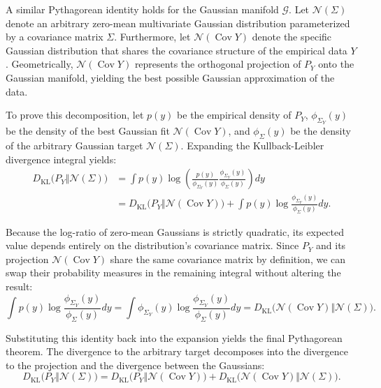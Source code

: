 \documentclass[12pt,a4paper,twoside,openany]{book}
\begin{document}
A similar Pythagorean identity holds for the Gaussian manifold $\mathcal{G}$. 
Let $\mathcal{N}(\Sigma)$ denote an arbitrary zero-mean multivariate Gaussian distribution parameterized by a covariance matrix $\Sigma$. 
Furthermore, let $\mathcal{N}(\operatorname{Cov} Y)$ denote the specific Gaussian distribution that shares the covariance structure 
of the empirical data $Y$. Geometrically, $\mathcal{N}(\operatorname{Cov} Y)$ represents the orthogonal projection of $P_Y$ onto the 
Gaussian manifold, yielding the best possible Gaussian approximation of the data. 

To prove this decomposition, let $p(y)$ be the empirical density of $P_Y$, $\phi_{\Sigma_Y}(y)$ be the density of 
the best Gaussian fit $\mathcal{N}(\operatorname{Cov} Y)$, and $\phi_{\Sigma}(y)$ be the density of the arbitrary Gaussian target $\mathcal{N}(\Sigma)$. 
Expanding the Kullback-Leibler divergence integral yields:
\begin{align}
    D_{\mathrm{KL}}\big(P_Y \Vert \mathcal{N}(\Sigma)\big) &= \int p(y) \log \left( \frac{p(y)}{\phi_{\Sigma_Y}(y)} \frac{\phi_{\Sigma_Y}(y)}{\phi_{\Sigma}(y)} \right) dy \nonumber \\
    &= D_{\mathrm{KL}}\big(P_Y \Vert \mathcal{N}(\operatorname{Cov} Y)\big) + \int p(y) \log \frac{\phi_{\Sigma_Y}(y)}{\phi_{\Sigma}(y)} dy.
\end{align}

Because the log-ratio of zero-mean Gaussians is strictly quadratic, its expected value depends entirely on the distribution's covariance matrix. 
Since $P_Y$ and its projection $\mathcal{N}(\operatorname{Cov} Y)$ share the same covariance matrix by definition, 
we can swap their probability measures in the remaining integral without altering the result:
\begin{equation}
    \int p(y) \log \frac{\phi_{\Sigma_Y}(y)}{\phi_{\Sigma}(y)} dy = \int \phi_{\Sigma_Y}(y) \log \frac{\phi_{\Sigma_Y}(y)}{\phi_{\Sigma}(y)} dy = D_{\mathrm{KL}}\big(\mathcal{N}(\operatorname{Cov} Y) \Vert \mathcal{N}(\Sigma)\big).
\end{equation}

Substituting this identity back into the expansion yields the final Pythagorean theorem. 
The divergence to the arbitrary target decomposes into the divergence to the projection and the divergence between the Gaussians:
\begin{equation}\label{eq:pythagoras_gaussian}
    D_{\mathrm{KL}}\big(P_Y \Vert \mathcal{N}(\Sigma)\big) = D_{\mathrm{KL}}\big(P_Y \Vert \mathcal{N}(\operatorname{Cov} Y)\big) + D_{\mathrm{KL}}\big(\mathcal{N}(\operatorname{Cov} Y) \Vert \mathcal{N}(\Sigma)\big).
\end{equation}
\end{document}
